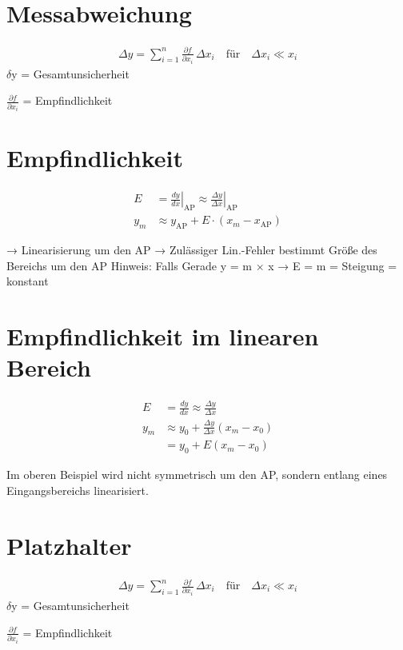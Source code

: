 \documentclass[10pt,a4paper]{article}
\begin{document}
	\twocolumn
	\pagestyle{fancy}
	\rhead{\today}
	\section{Messabweichung}
		\begin{mdframed}[style=exercise]
			\begin{align}
					\Delta y = \sum_{i=1}^{n} \frac{\partial f}{\partial x_i} \, \Delta x_i \quad \text{für} \quad \Delta x_i \ll x_i
			\end{align}
			$\delta$y = Gesamtunsicherheit \par
			$\frac{\partial f}{\partial x_i}$ = Empfindlichkeit
		\end{mdframed}
	
	\section{Empfindlichkeit}
		\begin{mdframed}[style=exercise]
			\begin{align}
				E &= \left. \frac{dy}{dx} \right|_{\text{AP}} \approx \left. \frac{\Delta y}{\Delta x} \right|_{\text{AP}} \\
				y_m &\approx y_{\text{AP}} + E \cdot (x_m - x_{\text{AP}})
			\end{align}
		\end{mdframed}
		→ Linearisierung um den AP
		→ Zulässiger Lin.-Fehler bestimmt Größe des Bereichs um den AP
		Hinweis: Falls Gerade y = m $\times$ x → E = m = Steigung = konstant
		
	\section{Empfindlichkeit im linearen Bereich}
		\begin{mdframed}[style=exercise]
			\begin{align}
			E &= \frac{dy}{dx} \approx \frac{\Delta y}{\Delta x} \\
			y_m &\approx y_0 + \frac{\Delta y}{\Delta x} (x_m - x_0) \\
			&= y_0 + E(x_m - x_0)
			\end{align}
		\end{mdframed}
		Im oberen Beispiel wird nicht symmetrisch um den AP, sondern entlang eines Eingangsbereichs linearisiert.
	

	
	\pagebreak
	
	
	\section{Platzhalter}
	\begin{mdframed}[style=exercise]
		\begin{align}
			\Delta y = \sum_{i=1}^{n} \frac{\partial f}{\partial x_i} \, \Delta x_i \quad \text{für} \quad \Delta x_i \ll x_i
		\end{align}
		$\delta$y = Gesamtunsicherheit \par
		$\frac{\partial f}{\partial x_i}$ = Empfindlichkeit
	\end{mdframed}
	
\end{document}

